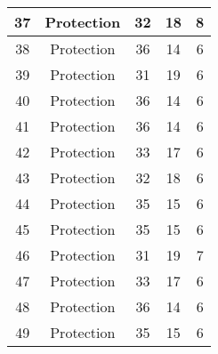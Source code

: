 \documentclass[results.tex]{subfiles}
\begin{document}
\begin{center}
\begin{tabular}{| c || c | c | c | c |}
            \hline
            37                      & Protection                   & 32                     & 18                      & 8                    \\
            \hline
            38                      & Protection                   & 36                     & 14                      & 6                    \\
            \hline
            39                      & Protection                   & 31                     & 19                      & 6                    \\
            \hline
            40                      & Protection                   & 36                     & 14                      & 6                    \\
            \hline
            41                      & Protection                   & 36                     & 14                      & 6                    \\
            \hline
            42                      & Protection                   & 33                     & 17                      & 6                    \\
            \hline
            43                      & Protection                   & 32                     & 18                      & 6                    \\
            \hline
            44                      & Protection                   & 35                     & 15                      & 6                    \\
            \hline
            45                      & Protection                   & 35                     & 15                      & 6                    \\
            \hline
            46                      & Protection                   & 31                     & 19                      & 7                    \\
            \hline
            47                      & Protection                   & 33                     & 17                      & 6                    \\
            \hline
            48                      & Protection                   & 36                     & 14                      & 6                    \\
            \hline
            49                      & Protection                   & 35                     & 15                      & 6                    \\
            \hline
        \end{tabular}
    \end{center}
\end{document}
